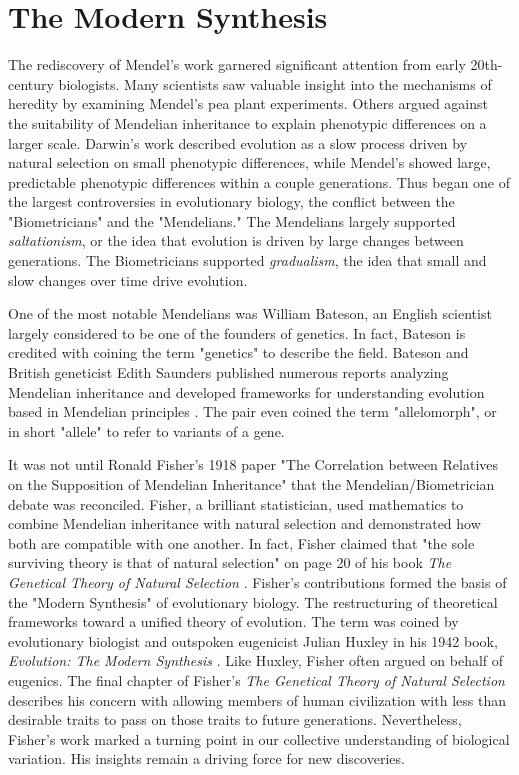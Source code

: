 \section{The Modern Synthesis}
The rediscovery of Mendel's work garnered significant attention from early 20th-century biologists. Many scientists saw valuable insight into the mechanisms of heredity by examining Mendel's pea plant experiments. Others argued against the suitability of Mendelian inheritance to explain phenotypic differences on a larger scale. Darwin's work described evolution as a slow process driven by natural selection on small phenotypic differences, while Mendel's showed large, predictable phenotypic differences within a couple generations. Thus began one of the largest controversies in evolutionary biology, the conflict between the "Biometricians" and the "Mendelians." The Mendelians largely supported \textit{saltationism}, or the idea that evolution is driven by large changes between generations. The Biometricians supported \textit{gradualism}, the idea that small and slow changes over time drive evolution. 


One of the most notable Mendelians was William Bateson, an English scientist largely considered to be one of the founders of genetics. In fact, Bateson is credited with coining the term "genetics" to describe the field. Bateson and British geneticist Edith Saunders published numerous reports analyzing Mendelian inheritance and developed frameworks for understanding evolution based in Mendelian principles \cite{bateson_reports_1902}. The pair even coined the term "allelomorph", or in short "allele" to refer to variants of a gene.  


It was not until Ronald Fisher's 1918 paper "The Correlation between Relatives on the Supposition of Mendelian Inheritance" \cite{fisher_1918} that the Mendelian/Biometrician debate was reconciled. \cite{visscher_r.._2019} Fisher, a brilliant statistician, used mathematics to combine Mendelian inheritance with natural selection and demonstrated how both are compatible with one another. In fact, Fisher claimed that "the sole surviving theory is that of natural selection" on page 20 of his book \textit{The Genetical Theory of Natural Selection} \cite{fisher_genetical_1930}. Fisher's contributions formed the basis of the "Modern Synthesis" of evolutionary biology. The restructuring of theoretical frameworks toward a unified theory of evolution. The term was coined by evolutionary biologist and outspoken eugenicist Julian Huxley in his 1942 book, \textit{Evolution: The Modern Synthesis} \cite{huxley_1942}. Like Huxley, Fisher often argued on behalf of eugenics. The final chapter of Fisher's \textit{The Genetical Theory of Natural Selection} describes his concern with allowing members of human civilization with less than desirable traits to pass on those traits to future generations. Nevertheless, Fisher's work marked a turning point in our collective understanding of biological variation. His insights remain a driving force for new discoveries.


